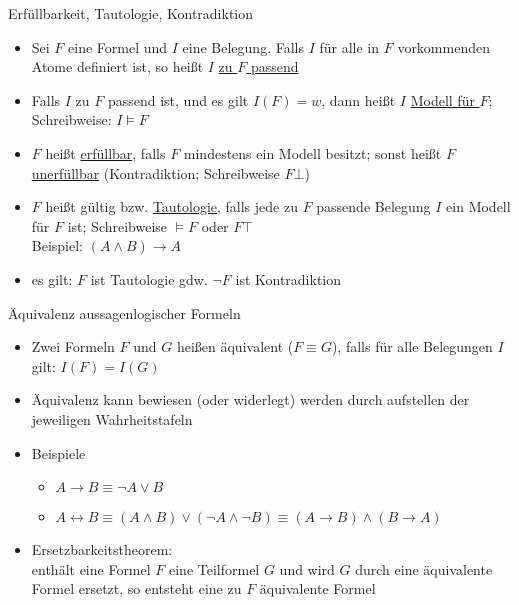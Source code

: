 \begin{frame}{Erfüllbarkeit, Tautologie, Kontradiktion}
	\begin{itemize}
		\item Sei $F$ eine Formel und $I$ eine Belegung. Falls $I$ für alle in $F$ vorkommenden Atome definiert ist, so heißt $I$ \underline{zu $F$ passend}
		\item Falls $I$ zu $F$ passend ist, und es gilt $I(F)=w$, dann heißt $I$ \underline{Modell für $F$}; Schreibweise: $I \models F$
		\item $F$ heißt \underline{erfüllbar}, falls $F$ mindestens ein Modell besitzt; sonst heißt $F$ \underline{unerfüllbar} (Kontradiktion; Schreibweise $F\bot$)
		\item $F$ heißt gültig bzw. \underline{Tautologie}, falls jede zu $F$ passende Belegung $I$ ein Modell für $F$ ist; Schreibweise $\models F$ oder $F\top$ \\
		Beispiel: $(A \land B) \rightarrow A$
		\item es gilt: $F$ ist Tautologie gdw. $\neg F$ ist Kontradiktion
	\end{itemize}
\end{frame}

\begin{frame}{Äquivalenz aussagenlogischer Formeln}
	\begin{itemize}
		\item Zwei Formeln $F$ und $G$ heißen äquivalent ($F \equiv G$), falls für alle Belegungen $I$ gilt: $I(F)=I(G)$
		\item Äquivalenz kann bewiesen (oder widerlegt) werden durch aufstellen der jeweiligen Wahrheitstafeln
		\item Beispiele
		\begin{itemize}
			\item $A \rightarrow B \equiv \neg A \lor B$
			\item $A \leftrightarrow B \equiv (A \land B) \lor (\neg A \land \neg B) \equiv (A \rightarrow B) \land (B \rightarrow A)$
		\end{itemize}
		\item Ersetzbarkeitstheorem:\\
		enthält eine Formel $F$ eine Teilformel $G$ und wird $G$ durch eine äquivalente Formel ersetzt, so entsteht eine zu $F$ äquivalente Formel
	\end{itemize}
\end{frame}

